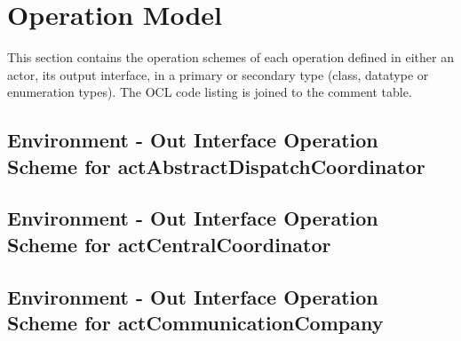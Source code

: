 \chapter{Operation Model}
\label{chap:lu.uni.lassy.excalibur.group09.spec-OM}

This section contains the operation schemes of each operation defined in either an actor, its output interface, in a primary or secondary type (class, datatype or enumeration types). 
The \msrmessir OCL code listing is joined to the comment table.

\lstset{
float,
basicstyle=\scriptsize,
language=Messir,
breakatwhitespace=false,
tabsize=2,
breaklines=true,
numbers=left,
emptylines=1,
numbersep=5pt,
showspaces=false,
showstringspaces=false,
showtabs=false
} 



		
\section{Environment - Out Interface Operation Scheme for actAbstractDispatchCoordinator}
\label{OM-EM-OutInterface-OS-actAbstractDispatchCoordinator}





\section{Environment - Out Interface Operation Scheme for actCentralCoordinator}
\label{OM-EM-OutInterface-OS-actCentralCoordinator}



\section{Environment - Out Interface Operation Scheme for actCommunicationCompany}
\label{OM-EM-OutInterface-OS-actCommunicationCompany}

